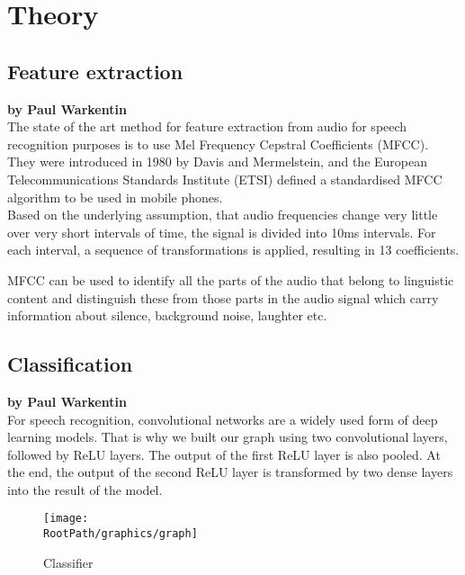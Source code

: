 \chapter{Theory}

\section{Feature extraction}

\textbf{by Paul Warkentin} \\

The state of the art method for feature extraction from audio for speech recognition purposes is to use Mel Frequency Cepstral Coefficients (MFCC). They were introduced in 1980 by Davis and Mermelstein, and the European Telecommunications Standards Institute (ETSI) defined a standardised MFCC algorithm to be used in mobile phones. \\
Based on the underlying assumption, that audio frequencies change very little over very short intervals of time, the signal is divided into 10ms intervals. For each interval, a sequence of transformations is applied, resulting in 13 coefficients.


MFCC can be used to identify all the parts of the audio that belong to linguistic content and distinguish these from those parts in the audio signal which carry information about silence, background noise, laughter etc.

\section{Classification}

\textbf{by Paul Warkentin} \\

For speech recognition, convolutional networks are a widely used form of deep learning models. That is why we built our graph using two convolutional layers, followed by ReLU layers. The output of the first ReLU layer is also pooled. At the end, the output of the second ReLU layer is transformed by two dense layers into the result of the model.


\begin{figure}
    \centering
    \texttt{[image: \\RootPath/graphics/graph]}
    \caption{Classifier}
\end{figure}
